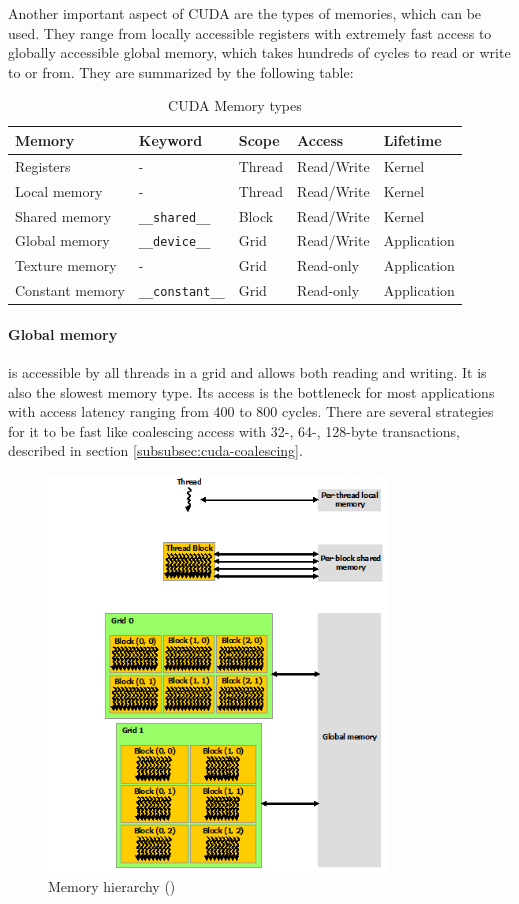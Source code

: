 Another important aspect of CUDA are the types of memories, which can be used. They range from locally accessible registers with extremely fast access to globally accessible global memory, which takes hundreds of cycles to read or write to or from. They are summarized by the following table:

\begin{table}
\centering
\begin{tabularx}{\textwidth}{| X | X | X | X | X |}
\hline
Memory & Keyword & Scope & Access & Lifetime \\
\hline
Registers & - & Thread & Read/Write & Kernel \\
\hline
Local memory & - & Thread & Read/Write & Kernel \\
\hline
Shared memory & \verb|__shared__| & Block & Read/Write &  Kernel \\
\hline
Global memory & \verb|__device__| & Grid & Read/Write & Application \\
\hline
Texture memory & - & Grid & Read-only & Application \\
\hline
Constant memory & \verb|__constant__| & Grid & Read-only & Application \\
\hline
\end{tabularx}
\caption{CUDA Memory types}
\end{table}

\paragraph{Global memory} is accessible by all threads in a grid and allows both reading and writing. It is also the slowest memory type. Its access is the bottleneck for most applications with access latency ranging from 400 to 800 cycles. There are several strategies for it to be fast like coalescing access with 32-, 64-, 128-byte transactions, described in section \ref{subsubsec:cuda-coalescing}.

\begin{center}
\begin{figure}[ht]
	\centering\includegraphics[height=10.5cm]{fig/memory-hierarchy.png}
	\caption{Memory hierarchy (\cite{cuda-toolkit-docs})}
\end{figure}
\end{center}

